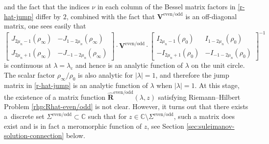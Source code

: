 \documentclass[11pt]{article}
\numberwithin{equation}{section}
\numberwithin{equation}{section}
\newcommand{\C}{{\mathbb{C}}}
\begin{document}
and the fact that the indices $\nu$ in each column of the Bessel matrix factors in \eqref{r-hat-jump} differ by $2$, combined with the fact that $\mathbf{V}^\mathrm{even/odd}$ is an off-diagonal matrix, one sees easily that
\[
\begin{bmatrix}J_{2\mu_n - 1}(\rho_\infty) & -J_{1- 2\mu_n}(\rho_\infty)\\
 J_{2\mu_n +1}(\rho_\infty) & -J_{-1-2\mu_n}(\rho_\infty)\end{bmatrix}\cdot\mathbf{V}^\mathrm{even/odd}
 \cdot \begin{bmatrix}I_{2\mu_n - 1}(\rho_0) & I_{1- 2\mu_n}(\rho_0)\\
 -I_{2\mu_n +1}(\rho_0) & -I_{-1-2\mu_n}(\rho_0)\end{bmatrix}^{-1}
\]
is continuous at $\lambda=\lambda_\mathrm{c}$ and hence is an analytic function of $\lambda$ on the unit circle. The scalar factor $\rho_\infty/\rho_0$ is also analytic for $|\lambda|=1$, and therefore the jump matrix in \eqref{r-hat-jump} is an analytic function of $\lambda$ when $|\lambda|=1$. At this stage, the existence of a matrix function $\hat{\mathbf{R}}^\mathrm{even/odd}(\lambda, z)$ satisfying Riemann--Hilbert Problem \ref{rhp:Rhat-even/odd} is not clear. However, it turns out that there exists a~discrete set $\Sigma^{\mathrm{even/odd}} \subset \C$ such that for $z \in \C \setminus \Sigma^{\mathrm{even/odd}}$, such a matrix does exist and is in fact a meromorphic function of $z$, see Section \ref{sec:suleimanov-solution-connection} below.
\end{document}
